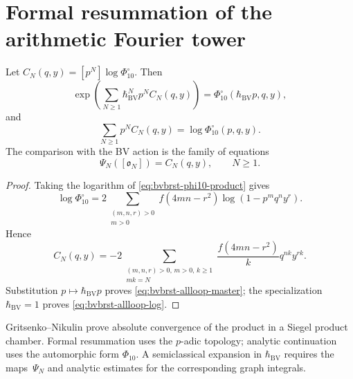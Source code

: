 \section{Formal resummation of the arithmetic Fourier tower}
\label{sec:bvbrst-allloop-resummation}

\begin{theorem}
\label{thm:bvbrst-allloop-resummation}
Let $C_N(q,y)=[p^N]\log\Phi_{10}^{\circ}$.  Then
\begin{equation}\label{eq:bvbrst-allloop-master}
 \exp\!\left(\sum_{N\geq1}
   \hbar_{\mathrm{BV}}^Np^N C_N(q,y)\right)
 =\Phi_{10}^{\circ}(\hbar_{\mathrm{BV}}p,q,y),
\end{equation}
and
\begin{equation}\label{eq:bvbrst-allloop-log}
 \sum_{N\geq1}p^NC_N(q,y)=\log\Phi_{10}^{\circ}(p,q,y).
\end{equation}
The comparison with the BV action is the family of equations
\begin{equation}\label{eq:bvbrst-allloop-effective-action}
 \Psi_N([\mathfrak o_N])=C_N(q,y),\qquad N\geq1.
\end{equation}
\end{theorem}

\begin{proof}
Taking the logarithm of \eqref{eq:bvbrst-phi10-product} gives
\begin{equation}\label{eq:bvbrst-allloop-log-expansion}
 \log\Phi_{10}^{\circ}
 =2\sum_{\substack{(m,n,r)>0\\m>0}}f(4mn-r^2)
      \log(1-p^mq^ny^r).
\end{equation}
Hence
\begin{equation}\label{eq:bvbrst-allloop-log-identity}
 C_N(q,y)=
 -2\!\sum_{\substack{(m,n,r)>0,\,m>0,\,k\geq1\\mk=N}}
 \frac{f(4mn-r^2)}{k}q^{nk}y^{rk}.
\end{equation}
Substitution $p\mapsto\hbar_{\mathrm{BV}}p$ proves
\eqref{eq:bvbrst-allloop-master}; the specialization
$\hbar_{\mathrm{BV}}=1$ proves \eqref{eq:bvbrst-allloop-log}.
\end{proof}

\begin{remark}
\label{rem:bvbrst-allloop-gevrey-scope}
Gritsenko--Nikulin prove absolute convergence of the product in a
Siegel product chamber.  Formal resummation uses the
$p$-adic topology; analytic continuation uses the automorphic form
$\Phi_{10}$.  A semiclassical expansion in $\hbar_{\mathrm{BV}}$
requires the maps~$\Psi_N$ and analytic estimates for the corresponding
graph integrals.
\end{remark}

